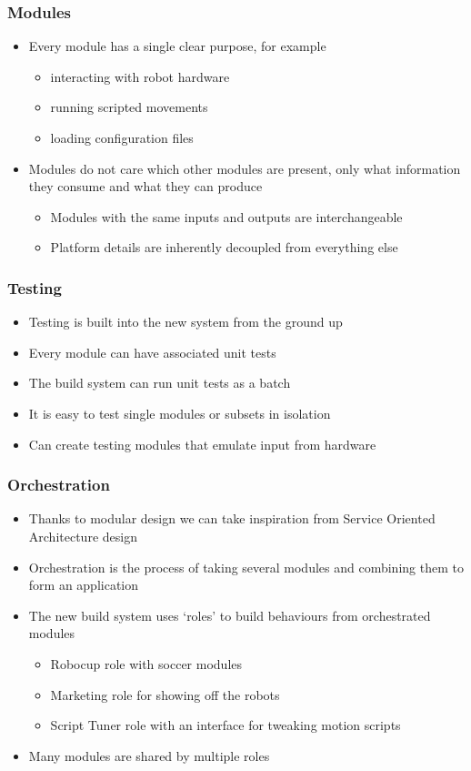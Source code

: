 \documentclass{beamer}
\begin{document}
\begin{frame}
	\frametitle{Modules}

	\begin{itemize}
		\item Every module has a single clear purpose, for example
		\begin{itemize}
			\item interacting with robot hardware
			\item running scripted movements
			\item loading configuration files
		\end{itemize}
		\item Modules do not care which other modules are present, only what information they consume and what they can produce
		\begin{itemize}
			\item Modules with the same inputs and outputs are interchangeable
			\item Platform details are inherently decoupled from everything else
		\end{itemize}
	\end{itemize}
\end{frame}

\begin{frame}
	\frametitle{Testing}

	\begin{itemize}
		\item Testing is built into the new system from the ground up
		\item Every module can have associated unit tests
		\item The build system can run unit tests as a batch
		\item It is easy to test single modules or subsets in isolation
		\item Can create testing modules that emulate input from hardware
	\end{itemize}
\end{frame}

\begin{frame}
	\frametitle{Orchestration}
	\begin{itemize}
		\item Thanks to modular design we can take inspiration from Service Oriented Architecture design
		\item Orchestration is the process of taking several modules and combining them to form an application
		\item The new build system uses `roles' to build behaviours from orchestrated modules
		\begin{itemize}
			\item Robocup role with soccer modules
			\item Marketing role for showing off the robots
			\item Script Tuner role with an interface for tweaking motion scripts
		\end{itemize}
		\item Many modules are shared by multiple roles
	\end{itemize}
\end{frame}
\end{document}
